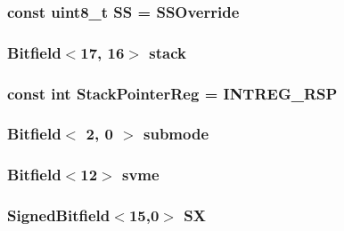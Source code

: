\label{namespaceX86ISA_a62886be1bcbf64566d5d2f90a0d27ffe}
\hypertarget{namespaceX86ISA_acbe8412158c492ec8a596b58ad73b5d7}{
\subsubsection[{SS}]{\setlength{\rightskip}{0pt plus 5cm}const uint8\_\-t {\bf SS} = SSOverride}}
\label{namespaceX86ISA_acbe8412158c492ec8a596b58ad73b5d7}
\hypertarget{namespaceX86ISA_a5398b6bccfd40edca69968c017b88a8e}{
\subsubsection[{stack}]{\setlength{\rightskip}{0pt plus 5cm}Bitfield$<$17, 16$>$ {\bf stack}}}
\label{namespaceX86ISA_a5398b6bccfd40edca69968c017b88a8e}
\hypertarget{namespaceX86ISA_a95d0846360ad0e64cb42fda7268a6434}{
\subsubsection[{StackPointerReg}]{\setlength{\rightskip}{0pt plus 5cm}const int {\bf StackPointerReg} = INTREG\_\-RSP}}
\label{namespaceX86ISA_a95d0846360ad0e64cb42fda7268a6434}
\hypertarget{namespaceX86ISA_ab30bbee1e7dd0bab4b2eb102e453af6c}{
\subsubsection[{submode}]{\setlength{\rightskip}{0pt plus 5cm}Bitfield$<$ 2, 0 $>$ {\bf submode}}}
\label{namespaceX86ISA_ab30bbee1e7dd0bab4b2eb102e453af6c}
\hypertarget{namespaceX86ISA_a4599fdd876f338854ee9fbf714ab8c02}{
\subsubsection[{svme}]{\setlength{\rightskip}{0pt plus 5cm}Bitfield$<$12$>$ {\bf svme}}}
\label{namespaceX86ISA_a4599fdd876f338854ee9fbf714ab8c02}
\hypertarget{namespaceX86ISA_a4e9bd10f5da85e48ae4377e8962cf60a}{
\subsubsection[{SX}]{\setlength{\rightskip}{0pt plus 5cm}SignedBitfield$<$15,0$>$ {\bf SX}}}
